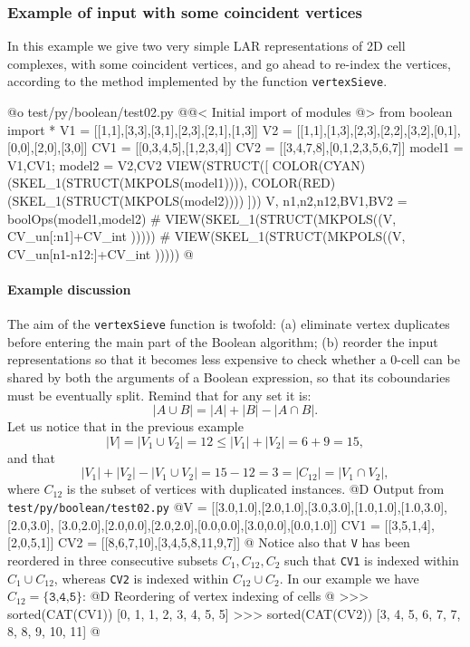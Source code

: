 \documentclass[11pt,oneside]{article}	%
\begin{document}
\subsubsection{Example of input with some coincident vertices}
In this example we give two very simple LAR representations of 2D cell complexes, with some coincident vertices, and go ahead to re-index the vertices, according to the method implemented by the function \texttt{vertexSieve}.

@o test/py/boolean/test02.py
@{@< Initial import of modules @>
from boolean import *
V1 = [[1,1],[3,3],[3,1],[2,3],[2,1],[1,3]]
V2 = [[1,1],[1,3],[2,3],[2,2],[3,2],[0,1],[0,0],[2,0],[3,0]]
CV1 = [[0,3,4,5],[1,2,3,4]]
CV2 = [[3,4,7,8],[0,1,2,3,5,6,7]]
model1 = V1,CV1; model2 = V2,CV2
VIEW(STRUCT([ 
	COLOR(CYAN)(SKEL_1(STRUCT(MKPOLS(model1)))), 
	COLOR(RED)(SKEL_1(STRUCT(MKPOLS(model2)))) ]))
V, n1,n2,n12,BV1,BV2 = boolOps(model1,model2)
# VIEW(SKEL_1(STRUCT(MKPOLS((V, CV_un[:n1]+CV_int )))))
# VIEW(SKEL_1(STRUCT(MKPOLS((V, CV_un[n1-n12:]+CV_int )))))
@}

\paragraph{Example discussion} 
The aim of the \texttt{vertexSieve} function is twofold: (a) eliminate vertex duplicates before entering the main part of the Boolean algorithm; (b) reorder the input representations so that it becomes less expensive to check whether a 0-cell can be shared by both the arguments of a Boolean expression, so that its coboundaries must be eventually split. Remind that for any set it is:
\[
|A\cup B| = |A|+|B|-|A\cap B|.
\]
Let us notice that in the previous example
\[
|V| = |V_1 \cup V_2| = 12 \leq |V_1|+|V_2| = 6+9 = 15,
\]
and that 
\[
|V_1|+|V_2| - |V_1 \cup V_2| = 15 - 12 = 3 = |C_{12}| = |V_1 \cap V_2|,
\]
where $C_{12}$ is the subset of vertices with duplicated instances.
@D Output from \texttt{test/py/boolean/test02.py}
@{V   = [[3.0,1.0],[2.0,1.0],[3.0,3.0],[1.0,1.0],[1.0,3.0],[2.0,3.0],
		 [3.0,2.0],[2.0,0.0],[2.0,2.0],[0.0,0.0],[3.0,0.0],[0.0,1.0]]
CV1 = [[3,5,1,4],[2,0,5,1]]
CV2 = [[8,6,7,10],[3,4,5,8,11,9,7]]
@}
Notice also that \texttt{V} has been reordered in three consecutive subsets $C_{1},C_{12},C_{2}$ such that \texttt{CV1} is indexed within $C_{1}\cup C_{12}$, whereas \texttt{CV2} is indexed within $C_{12}\cup C_{2}$. In our example we have  $C_{12}=\{\texttt{3,4,5}\}$: 
@D Reordering of vertex indexing of cells
@{
>>> sorted(CAT(CV1))
[0, 1, 1, 2, 3, 4, 5, 5]
>>> sorted(CAT(CV2))
[3, 4, 5, 6, 7, 7, 8, 8, 9, 10, 11]
@}
\end{document}
